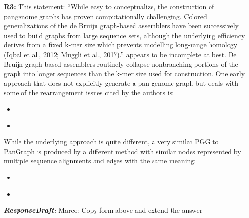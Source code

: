\documentclass[aps,rmp,onecolumn]{revtex4-1}
\newcommand{\Marco}[1]{{\color{orange}Marco: #1}}
\newcommand{\reviewer}[2]{\textbf{#1:} #2\vskip 5mm}
\newcommand{\responsedraft}[1]{{\it {\color{purple}\textbf{ResponseDraft:} #1}}\vskip 5mm}
\begin{document}
\reviewer{R3}{This statement: ``While easy to conceptualize, the construction of pangenome graphs has proven computationally challenging. Colored generalizations of the de Bruijn graph-based assemblers have been successively used to build graphs from large sequence sets, although the underlying efficiency derives from a fixed k-mer size which prevents modelling long-range homology (Iqbal et al., 2012; Muggli et al., 2017).'' appears to be incomplete at best. De Bruijn graph-based assemblers routinely collapse nonbranching portions of the graph into longer sequences than the k-mer size used for construction.
      One early approach that does not explicitly generate a pan-genome graph but deals with some of the rearrangement issues cited by the authors is:
      \begin{itemize}
            \item \cite{angiuoli2011improving}
            \item \cite{angiuoli2011mugsy}
      \end{itemize}
      While the underlying approach is quite different, a very similar PGG to PanGraph is produced by a different method with similar nodes represented by multiple sequence alignments and edges with the same meaning:
      \begin{itemize}
            \item \cite{sutton2021pan}
            \item \cite{chan2015novel}
      \end{itemize}}
\responsedraft{}
\Marco{Copy form above and extend the answer}
\end{document}

